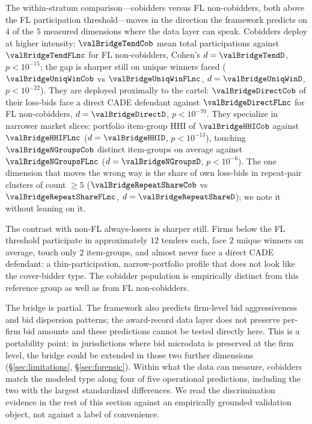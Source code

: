 

The within-stratum comparison---cobidders versus FL non-cobidders,
both above the FL participation threshold---moves in the direction
the framework predicts on $4$ of the $5$ measured dimensions where
the data layer can speak. Cobidders deploy at higher intensity:
$\valBridgeTendCob$ mean total participations against
$\valBridgeTendFLnc$ for FL non-cobidders, Cohen's $d=\valBridgeTendD$,
$p<10^{-15}$; the gap is sharper still on unique winners faced
($\valBridgeUniqWinCob$ vs $\valBridgeUniqWinFLnc$,
$d=\valBridgeUniqWinD$, $p<10^{-22}$). They are deployed proximally
to the cartel: $\valBridgeDirectCob$ of their loss-bids face a direct
CADE defendant against $\valBridgeDirectFLnc$ for FL non-cobidders,
$d=\valBridgeDirectD$, $p<10^{-70}$. They specialize in narrower
market slices: portfolio item-group HHI of $\valBridgeHHICob$
against $\valBridgeHHIFLnc$ ($d=\valBridgeHHID$,
$p<10^{-13}$), touching $\valBridgeNGroupsCob$ distinct item-groups
on average against $\valBridgeNGroupsFLnc$
($d=\valBridgeNGroupsD$, $p<10^{-6}$). The one dimension that
moves the wrong way is the share of own loss-bids in repeat-pair
clusters of count $\geq 5$
($\valBridgeRepeatShareCob$ vs $\valBridgeRepeatShareFLnc$,
$d=\valBridgeRepeatShareD$); we note it without leaning on it.

The contrast with non-FL always-losers is sharper still. Firms
below the FL threshold participate in approximately $12$ tenders
each, face $2$ unique winners on average, touch only $2$ item-groups,
and almost never face a direct CADE defendant: a thin-participation,
narrow-portfolio profile that does not look like the cover-bidder
type. The cobidder population is empirically distinct from this
reference group as well as from FL non-cobidders.

The bridge is partial. The framework also predicts firm-level bid
aggressiveness and bid dispersion patterns; the award-record data
layer does not preserve per-firm bid amounts and these predictions
cannot be tested directly here. This is a portability point: in
jurisdictions where bid microdata is preserved at the firm level,
the bridge could be extended in those two further dimensions
(\S\ref{sec:limitations}, \S\ref{sec:forensic}). Within what the
data can measure, cobidders match the modeled type along four of
five operational predictions, including the two with the largest
standardized differences. We read the discrimination evidence in
the rest of this section against an empirically grounded validation
object, not against a label of convenience.


